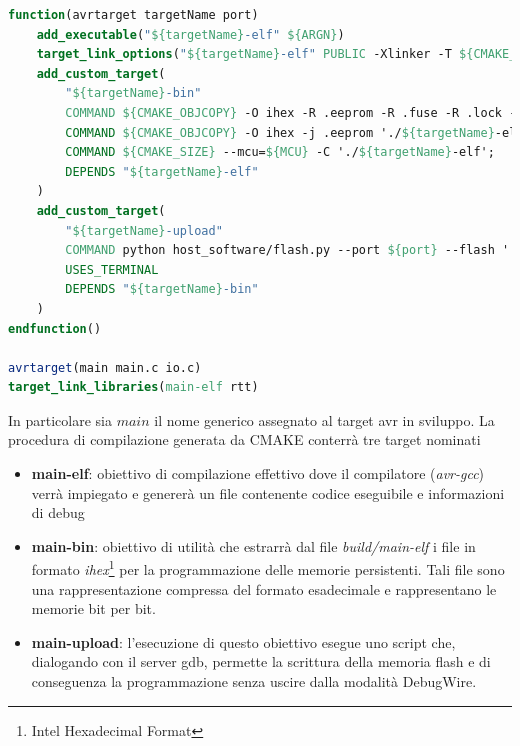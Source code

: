 \noindent\begin{minipage}{\textwidth}
    \begin{lstlisting}[language=CMAKE, caption={Definizione di un target di compilazione e upload per un dispositivo AVR}, label=lst:cmake-target]
function(avrtarget targetName port)
    add_executable("${targetName}-elf" ${ARGN})
    target_link_options("${targetName}-elf" PUBLIC -Xlinker -T ${CMAKE_SOURCE_DIR}/cmake/linker/${MCU}.ld)
    add_custom_target(
        "${targetName}-bin" 
        COMMAND ${CMAKE_OBJCOPY} -O ihex -R .eeprom -R .fuse -R .lock -R .signature './${targetName}-elf' './${targetName}.hex';
        COMMAND ${CMAKE_OBJCOPY} -O ihex -j .eeprom './${targetName}-elf' './${targetName}.eeprom.hex';
        COMMAND ${CMAKE_SIZE} --mcu=${MCU} -C './${targetName}-elf';
        DEPENDS "${targetName}-elf"
    )
    add_custom_target(
        "${targetName}-upload"
        COMMAND python host_software/flash.py --port ${port} --flash './${targetName}.hex' --mcu ${MCU}
        USES_TERMINAL
        DEPENDS "${targetName}-bin"
    )
endfunction()

avrtarget(main main.c io.c)
target_link_libraries(main-elf rtt)
    \end{lstlisting}
\end{minipage}

In particolare sia \(main\) il nome generico assegnato al target avr in sviluppo. La procedura di compilazione generata da CMAKE conterrà tre target nominati
\begin{itemize}
    \item \textbf{main-elf}: obiettivo di compilazione effettivo dove il compilatore (\textit{avr-gcc}) verrà impiegato e genererà un file contenente codice eseguibile e informazioni di debug
    \item \textbf{main-bin}: obiettivo di utilità che estrarrà dal file \textit{build/main-elf} i file in formato \textit{ihex}\footnote{Intel Hexadecimal Format} per la programmazione delle memorie persistenti. Tali file sono una rappresentazione compressa del formato esadecimale\cite{site:ihex} e rappresentano le memorie bit per bit.
    \item \textbf{main-upload}: l'esecuzione di questo obiettivo esegue uno script che, dialogando con il server gdb, permette la scrittura della memoria flash e di conseguenza la programmazione senza uscire dalla modalità DebugWire.
\end{itemize}


